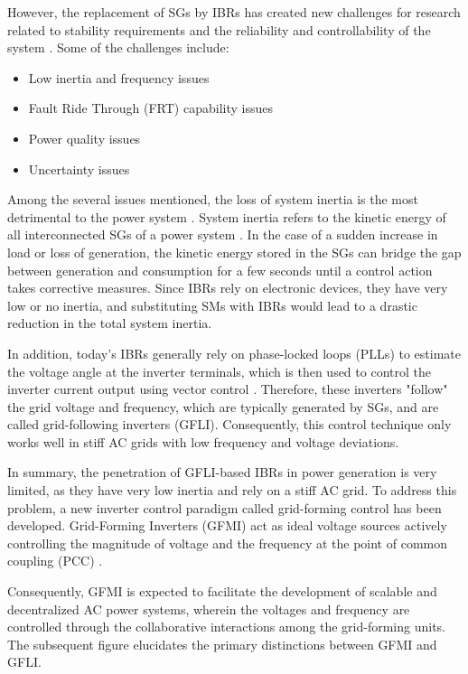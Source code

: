 However, the replacement of SGs by IBRs has created new challenges for research
related to stability requirements and the reliability and controllability of the
system \cite{alam2020challenges}. Some of the challenges include:

\begin{itemize}
    \item Low inertia and frequency issues
    \item Fault Ride Through (FRT) capability issues
    \item Power quality issues
    \item Uncertainty issues
\end{itemize}

Among the several issues mentioned, the loss of system inertia is the most
detrimental to the power system \cite{alam2020challenges}. System inertia refers
to the kinetic energy of all interconnected SGs of a power
system \cite{denholm2020inertia}. In the case of a sudden increase in load or
loss of generation, the kinetic energy stored in the SGs can bridge the gap
between generation and consumption for a few seconds until a control action
takes corrective measures. Since IBRs rely on electronic devices, they have very
low or no inertia, and substituting SMs with IBRs would lead to a drastic
reduction in the total system inertia.

In addition, today's IBRs generally rely on phase-locked loops (PLLs) to
estimate the voltage angle at the inverter terminals, which is then used to
control the inverter current output using vector control \cite{ndreko2018grid}.
Therefore, these inverters "follow" the grid voltage and frequency, which are
typically generated by SGs, and are called grid-following inverters (GFLI).
Consequently, this control technique only works well in stiff AC grids with low
frequency and voltage deviations.

In summary, the penetration of GFLI-based IBRs in power generation is very
limited, as they have very low inertia and rely on a stiff AC grid. To address
this problem, a new inverter control paradigm called grid-forming control has
been developed. Grid-Forming Inverters (GFMI) act as ideal voltage sources
actively controlling the magnitude of voltage and the frequency at the point of
common coupling (PCC) \cite{pattabiraman2018comparison}.

Consequently, GFMI is expected to facilitate the development of scalable and
decentralized AC power systems, wherein the voltages and frequency are
controlled through the collaborative interactions among the grid-forming units.
The subsequent figure elucidates the primary distinctions between GFMI and GFLI.

